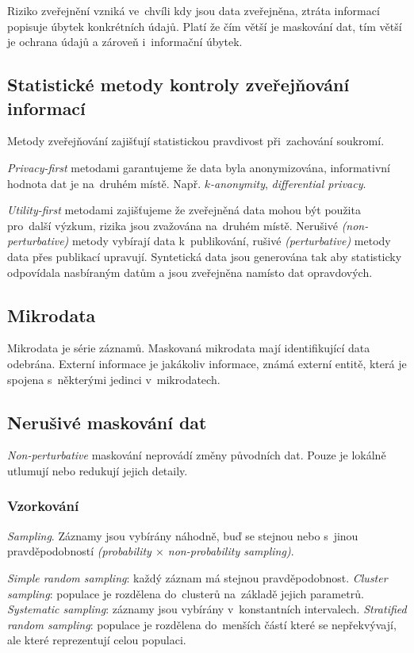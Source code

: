Riziko zveřejnění vzniká ve~chvíli kdy jsou data zveřejněna, ztráta informací popisuje úbytek konkrétních údajů.
Platí že čím větší je maskování dat, tím větší je ochrana údajů a zároveň i~informační úbytek.


\subsection{Statistické metody kontroly zveřejňování informací}

Metody zveřejňování zajišťují statistickou pravdivost při~zachování soukromí.

\emph{Privacy-first} metodami garantujeme že data byla anonymizována, informativní hodnota dat je na~druhém místě.
Např. \emph{$k$-anonymity}, \emph{differential privacy}.

\emph{Utility-first} metodami zajišťujeme že zveřejněná data mohou být použita pro~další výzkum, rizika jsou zvažována na~druhém místě.
Nerušivé \emph{(non-perturbative)} metody vybírají data k~publikování, rušivé \emph{(perturbative)} metody data přes publikací upravují.
Syntetická data jsou generována tak aby statisticky odpovídala nasbíraným datům a jsou zveřejněna namísto dat opravdových.


\subsection{Mikrodata}

Mikrodata je série záznamů.
Maskovaná mikrodata mají identifikující data odebrána.
Externí informace je jakákoliv informace, známá externí entitě, která je spojena s~některými jedinci v~mikrodatech.


\subsection{Nerušivé maskování dat}

\emph{Non-perturbative} maskování neprovádí změny původních dat.
Pouze je lokálně utlumují nebo redukují jejich detaily.


\subsubsection*{Vzorkování}

\emph{Sampling}.
Záznamy jsou vybírány náhodně, buď se stejnou nebo s~jinou pravděpodobností \emph{(probability $\times$ non-probability sampling)}.

\emph{Simple random sampling}: každý záznam má stejnou pravděpodobnost.
\emph{Cluster sampling}: populace je rozdělena do~clusterů na~základě jejich parametrů.
\emph{Systematic sampling}: záznamy jsou vybírány v~konstantních intervalech.
\emph{Stratified random sampling}: populace je rozdělena do~menších částí které se nepřekvývají, ale které reprezentují celou populaci.


